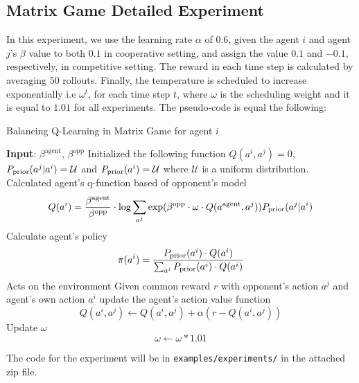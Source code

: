 \subsection{Matrix Game Detailed Experiment}
\label{appx:chap4-matrix-game-explain}

In this experiment, we use the learning rate $\alpha$ of $0.6$, given the agent $i$ and agent $j$'s $\beta$ value to both $0.1$ in cooperative setting, and assign the value $0.1$ and $-0.1$, respectively, in competitive setting. The reward in each time step is calculated by averaging $50$ rollouts. Finally, the temperature is scheduled to increase exponentially i.e $\omega^t$, for each time step $t$, where $\omega$ is the scheduling weight and it is equal to $1.01$ for all experiments. The pseudo-code is equal the following:
\begin{algorithm}[H]
    \caption{Balancing Q-Learning in Matrix Game for agent $i$}
	\begin{algorithmic}[1]
	    \State \textbf{Input}: $\beta^{\text{agent}}$, $\beta^{\text{opp}}$
	   \State Initialized the following function $Q(a^i, a^j) = 0$, $P_{\text{prior}}(a^j | a^i) = \mathcal{U}$ and $P_{\text{prior}}(a^i) = \mathcal{U}$ where $\mathcal{U}$ is a uniform distribution.
		    \State Calculated agent's q-function based of opponent's model
		    \begin{equation*}
		        Q(a^i) = \frac{\beta^{\text{agent}}}{\beta^{\text{opp}}} \cdot \log \sum_{a^{j}} \exp(\beta^{\text{opp}} \cdot \omega \cdot Q(a^\text{agent}, a^j)) P_{\text{prior}}(a^j | a^i)
		    \end{equation*}
		    \State Calculate agent's policy
		    \begin{equation}
		        \pi(a^i) = \frac{P_{\text{prior}}(a^i)\cdot Q(a^i)}{\sum_{a^i} P_{\text{prior}}(a^i)\cdot Q(a^i)}
		    \end{equation}
		    \State Acts on the environment
		    \State Given common reward $r$ with opponent's action $a^j$ and agent's own action $a^i$ update the agent's action value function
		    \begin{equation*}
		        Q(a^i, a^j) \leftarrow Q(a^i, a^j) + \alpha (r - Q(a^i, a^j))
		    \end{equation*}
		    \State Update $\omega$ 
		    \begin{equation*}
		        \omega \leftarrow \omega * 1.01
		    \end{equation*}
		\EndFor
	\end{algorithmic} 
\end{algorithm}
\noindent
The code for the experiment will be in \texttt{examples/experiments/} in the attached zip file.